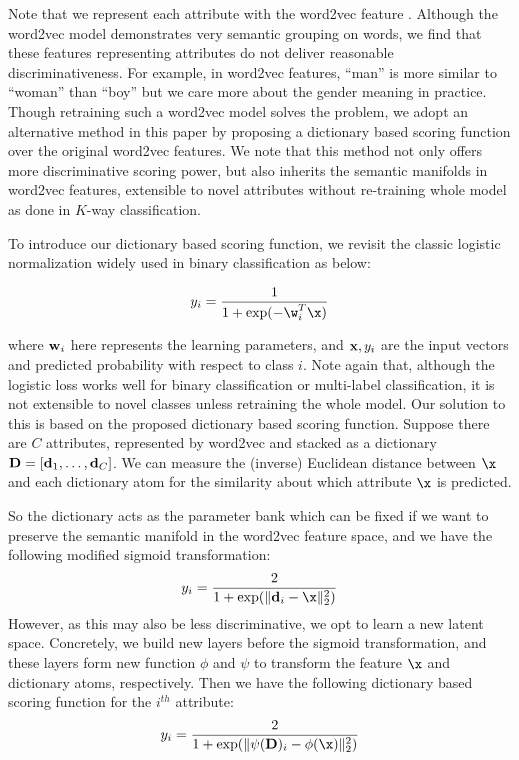 Note that we represent each attribute with the word2vec feature \citep{mikolov2013distributed}.
Although the word2vec model demonstrates very semantic grouping on words,
we find that these features representing attributes do not deliver reasonable discriminativeness. For example, in word2vec features,
``man'' is more similar to ``woman'' than ``boy'' but we care more about the gender meaning in practice.
Though retraining such a word2vec model solves the problem,
we adopt an alternative method in this paper by proposing a dictionary based scoring function
over the original word2vec features.
We note that this method not only offers more discriminative scoring power,
but also inherits the semantic manifolds in word2vec features,
extensible to novel attributes without re-training whole model as done in $K$-way classification.

To introduce our dictionary based scoring function,
we revisit the classic logistic normalization widely used in binary classification as below:

\begin{equation}
	y_i = \frac{1}{1+\exp(-\w_i^T\x)}
\end{equation}

where ${\bf w}_i$ here represents the learning parameters, 
and ${\bf x}, y_i$ are the input vectors and predicted probability with respect to class $i$.
Note again that, although the logistic loss works well for binary classification
or multi-label classification,
it is not extensible to novel classes unless retraining the whole model.
Our solution to this is based on the proposed dictionary based scoring function.
Suppose there are $C$ attributes, represented by word2vec and stacked as a dictionary
${\bf D}=[{\bf d}_1, \dots, {\bf d}_C]$.
We can measure the (inverse) Euclidean distance between $\x$ and each dictionary atom
for the similarity about which attribute $\x$ is predicted.

So the dictionary acts as the parameter bank
which can be fixed if we want to preserve the
semantic manifold in the word2vec feature space,
and we have the following modified sigmoid transformation:
\begin{equation}
	y_i = \frac{2}{1+\exp(\Vert{\bf d}_i-\x\Vert_2^2)}	
\end{equation}
However, as this may also be less discriminative,
we opt to learn a new latent space.
Concretely, we build new layers before the sigmoid transformation,
and these layers form new function $\phi$ and $\psi$
to transform the feature $\x$ and dictionary atoms, respectively.
Then we have the following dictionary based scoring function for the $i^{th}$ attribute:
\begin{equation}
	y_i = \frac{2}{1+\exp(\Vert \psi({\bf D})_i - \phi(\x)\Vert_2^2)}	
\end{equation}


